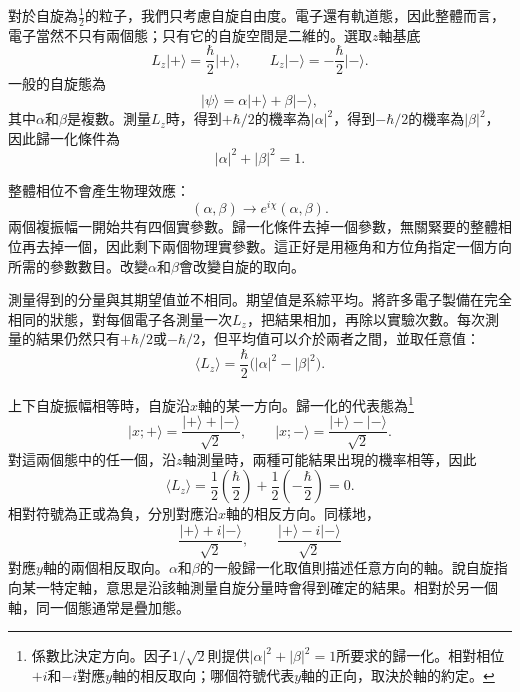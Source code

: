 對於自旋為\(\tfrac12\)的粒子，我們只考慮自旋自由度。電子還有軌道態，因此整體而言，電子當然不只有兩個態；只有它的自旋空間是二維的。選取\(z\)軸基底
\begin{equation}
L_z\lvert+\rangle=\frac{\hbar}{2}\lvert+\rangle,
\qquad
L_z\lvert-\rangle=-\frac{\hbar}{2}\lvert-\rangle.
\end{equation}
一般的自旋態為
\begin{equation}
\lvert\psi\rangle
=
\alpha\lvert+\rangle+\beta\lvert-\rangle,
\end{equation}
其中\(\alpha\)和\(\beta\)是複數。測量\(L_z\)時，得到\(+\hbar/2\)的機率為\(|\alpha|^2\)，得到\(-\hbar/2\)的機率為\(|\beta|^2\)，因此歸一化條件為
\begin{equation}
|\alpha|^2+|\beta|^2=1.
\end{equation}

整體相位不會產生物理效應：
\begin{equation}
(\alpha,\beta)\longrightarrow
e^{i\chi}(\alpha,\beta).
\end{equation}
兩個複振幅一開始共有四個實參數。歸一化條件去掉一個參數，無關緊要的整體相位再去掉一個，因此剩下兩個物理實參數。這正好是用極角和方位角指定一個方向所需的參數數目。改變\(\alpha\)和\(\beta\)會改變自旋的取向。

測量得到的分量與其期望值並不相同。期望值是系綜平均。將許多電子製備在完全相同的狀態，對每個電子各測量一次\(L_z\)，把結果相加，再除以實驗次數。每次測量的結果仍然只有\(+\hbar/2\)或\(-\hbar/2\)，但平均值可以介於兩者之間，並取任意值：
\begin{equation}
\langle L_z\rangle
=
\frac{\hbar}{2}\bigl(|\alpha|^2-|\beta|^2\bigr).
\end{equation}

上下自旋振幅相等時，自旋沿\(x\)軸的某一方向。歸一化的代表態為\footnote{係數比決定方向。因子\(1/\sqrt2\)則提供\( |\alpha|^2+|\beta|^2=1\)所要求的歸一化。相對相位\(+i\)和\(-i\)對應\(y\)軸的相反取向；哪個符號代表\(y\)軸的正向，取決於軸的約定。}
\begin{equation}
\lvert x;+\rangle
=
\frac{\lvert+\rangle+\lvert-\rangle}{\sqrt2},
\qquad
\lvert x;-\rangle
=
\frac{\lvert+\rangle-\lvert-\rangle}{\sqrt2}.
\end{equation}
對這兩個態中的任一個，沿\(z\)軸測量時，兩種可能結果出現的機率相等，因此
\begin{equation}
\langle L_z\rangle
=
\frac12\left(\frac{\hbar}{2}\right)
+
\frac12\left(-\frac{\hbar}{2}\right)
=0.
\end{equation}
相對符號為正或為負，分別對應沿\(x\)軸的相反方向。同樣地，
\begin{equation}
\frac{\lvert+\rangle+i\lvert-\rangle}{\sqrt2},
\qquad
\frac{\lvert+\rangle-i\lvert-\rangle}{\sqrt2}
\end{equation}
對應\(y\)軸的兩個相反取向。\(\alpha\)和\(\beta\)的一般歸一化取值則描述任意方向的軸。說自旋指向某一特定軸，意思是沿該軸測量自旋分量時會得到確定的結果。相對於另一個軸，同一個態通常是疊加態。


